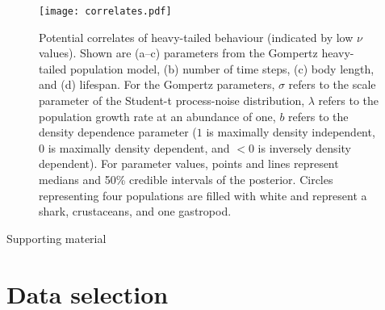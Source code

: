 \documentclass[11pt]{article}
\begin{document}

\clearpage

\begin{figure}[htbp]
\begin{center}
\texttt{[image: correlates.pdf]}
\caption{
Potential correlates of heavy-tailed behaviour (indicated by low $\nu$ values). Shown are (a--c) parameters from the Gompertz heavy-tailed population model, (b) number of time steps, (c) body length, and (d) lifespan.
For the Gompertz parameters, $\sigma$ refers to the scale parameter of the Student-t process-noise distribution, $\lambda$ refers to the population growth rate at an abundance of one, $b$ refers to the density dependence parameter ($1$ is maximally density independent, $0$ is maximally density dependent, and $<0$ is inversely density dependent).
For parameter values, points and lines represent medians and 50\% credible intervals of the posterior.
Circles representing four populations are filled with white and represent a shark, crustaceans, and one gastropod.
}
\label{fig:correlates}
\end{center}
\end{figure}

\clearpage

\begin{centering}
\LARGE
Supporting material\\[1.5em]
\end{centering}

\section{Data selection}
\end{document}
